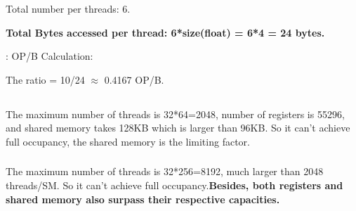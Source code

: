 \documentclass{article}
\begin{document}
Total number per threads: 6.

\textbf{Total Bytes accessed per thread: 6*size(float) = 6*4 = 24 bytes.}

: OP/B Calculation:

The ratio = 10/24 \(\approx\) 0.4167 OP/B.

\subsection{}
\subsubsection{}
The maximum number of threads is 32*64=2048, number of registers is 55296, and shared memory takes 128KB which is larger than 96KB. So it can't achieve full occupancy, the shared memory is the limiting factor.

\subsubsection{}
The maximum number of threads is 32*256=8192, much larger than 2048 threads/SM. So it can't achieve full occupancy.\textbf{Besides, both registers and shared memory also surpass their respective capacities.}
\end{document}
